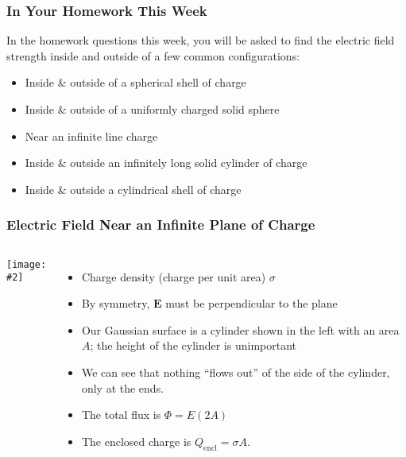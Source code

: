 \documentclass[12pt,aspectratio=169]{beamer}
\newcommand{\pic}[2]{\texttt{[image: \#2]}}
\newcommand{\mb}[1]{\mathbf{#1}}
\begin{document}
\begin{frame}
  \frametitle{In Your Homework This Week}
  In the homework questions this week, you will be asked to find the
  electric field strength inside and outside of a few common configurations:
  \begin{itemize}
  \item Inside \& outside of a spherical shell of charge
  \item Inside \& outside of a uniformly charged solid sphere
  \item Near an infinite line charge
  \item Inside \& outside an infinitely long solid cylinder of charge
  \item Inside \& outside a cylindrical shell of charge
  \end{itemize}
\end{frame}


\begin{frame}
  \frametitle{Electric Field Near an Infinite Plane of Charge}
  \begin{columns}
    \pic{1.3}{elec_gauss_figure9.jpg}

    \begin{itemize}
    \item Charge density (charge per unit area) $\sigma$
    \item By symmetry, $\mb{E}$ must be perpendicular to the plane
    \item Our Gaussian surface is a cylinder shown in the left with an area
      $A$; the height of the cylinder is unimportant
    \item We can see that nothing ``flows out'' of the side of the cylinder,
      only at the ends.
    \item The total flux is $\Phi=E(2A)$
    \item The enclosed charge is $Q_\mathrm{encl}=\sigma A$.
    \end{itemize}
  \end{columns}
\end{frame}
\end{document}
